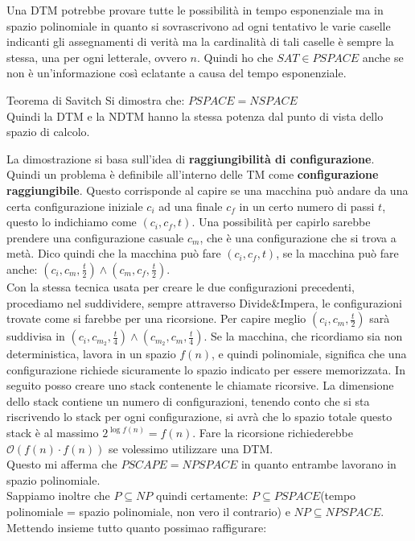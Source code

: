 Una DTM potrebbe provare tutte le possibilità in tempo esponenziale ma in spazio polinomiale in quanto si sovrascrivono ad ogni tentativo le varie caselle indicanti gli assegnamenti di verità ma la cardinalità di tali caselle è sempre la stessa, una per ogni letterale, ovvero $n$. Quindi ho che $SAT\in PSPACE$ anche se non è un'informazione così eclatante a causa del tempo esponenziale.

\begin{teorema}{Teorema di Savitch}{}
  Si dimostra che:  $PSPACE=NSPACE$\\
  Quindi la DTM e la NDTM hanno la stessa potenza dal punto di vista dello spazio di calcolo.
\end{teorema}

La dimostrazione si basa sull'idea di \textbf{raggiungibilità di configurazione}. Quindi un problema è definibile all'interno delle TM come \textbf{configurazione raggiungibile}. Questo corrisponde al capire se una macchina può andare da una certa configurazione iniziale $c_i$ ad una finale $c_f$ in un certo numero di passi $t$, questo lo indichiamo come $(c_i,c_f,t)$. Una possibilità per capirlo sarebbe prendere una configurazione casuale $c_m$, che è una configurazione che si trova  a metà. Dico quindi che la macchina può fare $(c_i,c_f,t)$, se la macchina può fare anche: $\displaystyle \left(c_i,c_m,\frac{t}{2}\right)\land \displaystyle \left(c_m,c_f,\frac{t}{2}\right)$.\\
Con la stessa tecnica usata per creare le due configurazioni precedenti, procediamo nel suddividere, sempre attraverso Divide\&Impera, le configurazioni trovate come si farebbe per una ricorsione. Per capire meglio $\displaystyle \left(c_i,c_m,\frac{t}{2}\right)$ sarà suddivisa in $\displaystyle  \left (c_i,c_{m_2}, \frac{t}{4} \right) \land \displaystyle \left(c_{m_2},c_m,\frac{t}{4}\right)$. Se la macchina, che ricordiamo sia non deterministica, lavora in un spazio $f(n)$, e quindi polinomiale, significa che una configurazione richiede sicuramente lo spazio indicato per essere memorizzata. In seguito posso creare uno stack contenente le chiamate ricorsive. La dimensione dello stack contiene un numero di configurazioni, tenendo conto che si sta riscrivendo lo stack per ogni configurazione, si avrà che lo spazio totale questo stack è al massimo $2^{\log f(n)}=f(n)$. Fare la ricorsione richiederebbe $\mathcal{O}(f(n) \cdot f(n))$ se volessimo utilizzare una DTM.\\

Questo mi afferma che $PSCAPE = NPSPACE$ in quanto entrambe lavorano in spazio polinomiale. \\
Sappiamo inoltre che $P\subseteq NP$ quindi certamente: $P\subseteq PSPACE$(tempo polinomiale = spazio polinomiale, non vero il contrario) e $NP\subseteq NPSPACE$. Mettendo insieme tutto quanto possimao raffigurare: 


